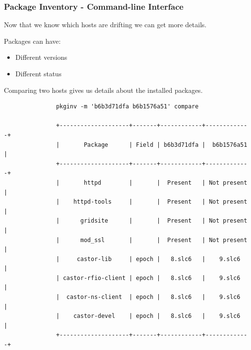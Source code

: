 \documentclass[aspectratio=169]{beamer}
\begin{document}

\begin{frame}[fragile]
    \frametitle{Package Inventory - Command-line Interface}
    \begin{minipage}[t]{0.95\textwidth}

        Now that we know which hosts are drifting we can get more details.

        Packages can have:
        \begin{itemize}
            \item Different versions
            \item Different status
        \end{itemize}

        Comparing two hosts gives us details about the installed packages.
        \vspace{10px}
    \end{minipage}
    \vspace{\belowdisplayskip}
    \begin{minipage}[t]{0.95\textwidth}
        \centering
        \linespread{1px}
        \begin{verbatim}
               pkginv -m 'b6b3d71dfa b6b1576a51' compare

               +--------------------+-------+------------+-------------+
               |       Package      | Field | b6b3d71dfa |  b6b1576a51 |
               +--------------------+-------+------------+-------------+
               |       httpd        |       |  Present   | Not present |
               |    httpd-tools     |       |  Present   | Not present |
               |      gridsite      |       |  Present   | Not present |
               |      mod_ssl       |       |  Present   | Not present |
               |     castor-lib     | epoch |   8.slc6   |    9.slc6   |
               | castor-rfio-client | epoch |   8.slc6   |    9.slc6   |
               |  castor-ns-client  | epoch |   8.slc6   |    9.slc6   |
               |    castor-devel    | epoch |   8.slc6   |    9.slc6   |
               +--------------------+-------+------------+-------------+
        \end{verbatim}
    \end{minipage}
\end{frame}

\end{document}
